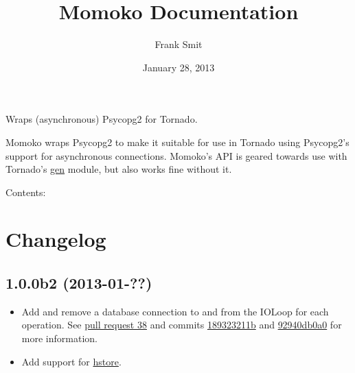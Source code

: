 \documentclass[letterpaper,10pt,english]{sphinxmanual}
\title{Momoko Documentation}
\date{January 28, 2013}
\author{Frank Smit}
\begin{document}
\maketitle
\tableofcontents
{}\label{index::doc}


Wraps (asynchronous) Psycopg2 for Tornado.

Momoko wraps Psycopg2 to make it suitable for use in Tornado using Psycopg2's
support for asynchronous connections. Momoko's API is geared towards use with
Tornado's \href{http://www.tornadoweb.org/documentation/gen.html}{gen} module, but also works fine without it.

Contents:


\chapter{Changelog}
\label{changelog:id1}\label{changelog:overview}\label{changelog:momoko}\label{changelog:changelog}\label{changelog::doc}

\section{1.0.0b2 (2013-01-??)}
\label{changelog:b2-2013-01}\begin{itemize}
\item {} 
Add and remove a database connection to and from the IOLoop for each operation.
See \href{https://github.com/FSX/momoko/pull/38}{pull request 38} and commits \href{https://github.com/FSX/momoko/commit/189323211bcb44ea158f41ddf87d4240c0e657d6}{189323211b} and \href{https://github.com/FSX/momoko/commit/92940db0a0f6d780724f42d3d66f1b75a78430ff}{92940db0a0} for more information.

\item {} 
Add support for \href{http://www.postgresql.org/docs/9.2/static/hstore.html}{hstore}.

\end{itemize}
\end{document}
